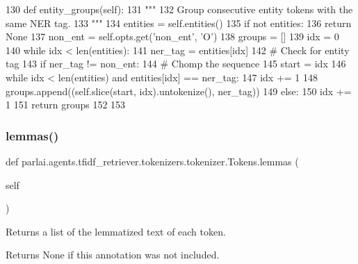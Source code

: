 \begin{DoxyCode}
130     \textcolor{keyword}{def }entity\_groups(self):
131         \textcolor{stringliteral}{"""}
132 \textcolor{stringliteral}{        Group consecutive entity tokens with the same NER tag.}
133 \textcolor{stringliteral}{        """}
134         entities = self.entities()
135         \textcolor{keywordflow}{if} \textcolor{keywordflow}{not} entities:
136             \textcolor{keywordflow}{return} \textcolor{keywordtype}{None}
137         non\_ent = self.opts.get(\textcolor{stringliteral}{'non\_ent'}, \textcolor{stringliteral}{'O'})
138         groups = []
139         idx = 0
140         \textcolor{keywordflow}{while} idx < len(entities):
141             ner\_tag = entities[idx]
142             \textcolor{comment}{# Check for entity tag}
143             \textcolor{keywordflow}{if} ner\_tag != non\_ent:
144                 \textcolor{comment}{# Chomp the sequence}
145                 start = idx
146                 \textcolor{keywordflow}{while} idx < len(entities) \textcolor{keywordflow}{and} entities[idx] == ner\_tag:
147                     idx += 1
148                 groups.append((self.slice(start, idx).untokenize(), ner\_tag))
149             \textcolor{keywordflow}{else}:
150                 idx += 1
151         \textcolor{keywordflow}{return} groups
152 
153 
\end{DoxyCode}
\mbox{\label{classparlai_1_1agents_1_1tfidf__retriever_1_1tokenizers_1_1tokenizer_1_1Tokens_acc0353a15e5585dae3bd08943b9abe0c}} 
\subsubsection{\texorpdfstring{lemmas()}{lemmas()}}
{\footnotesize\ttfamily def parlai.\+agents.\+tfidf\+\_\+retriever.\+tokenizers.\+tokenizer.\+Tokens.\+lemmas (\begin{DoxyParamCaption}\item[{}]{self }\end{DoxyParamCaption})}

\begin{DoxyVerb}Returns a list of the lemmatized text of each token.

Returns None if this annotation was not included.
\end{DoxyVerb}
 


